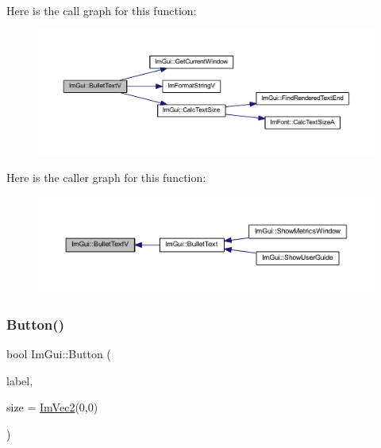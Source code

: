 Here is the call graph for this function\+:
\nopagebreak
\begin{figure}[H]
\begin{center}
\leavevmode
\includegraphics[width=350pt]{namespace_im_gui_af8f4b5e96c745e205974857f9a584583_cgraph}
\end{center}
\end{figure}
Here is the caller graph for this function\+:
\nopagebreak
\begin{figure}[H]
\begin{center}
\leavevmode
\includegraphics[width=350pt]{namespace_im_gui_af8f4b5e96c745e205974857f9a584583_icgraph}
\end{center}
\end{figure}
\mbox{\label{namespace_im_gui_a38094c568ce398db5a3abb9d3ac92030}} 
\subsubsection{\texorpdfstring{Button()}{Button()}}
{\footnotesize\ttfamily bool Im\+Gui\+::\+Button (\begin{DoxyParamCaption}\item[{const char $\ast$}]{label,  }\item[{const \mbox{\hyperlink{struct_im_vec2}{Im\+Vec2}} \&}]{size = {\ttfamily \mbox{\hyperlink{struct_im_vec2}{Im\+Vec2}}(0,0)} }\end{DoxyParamCaption})}

